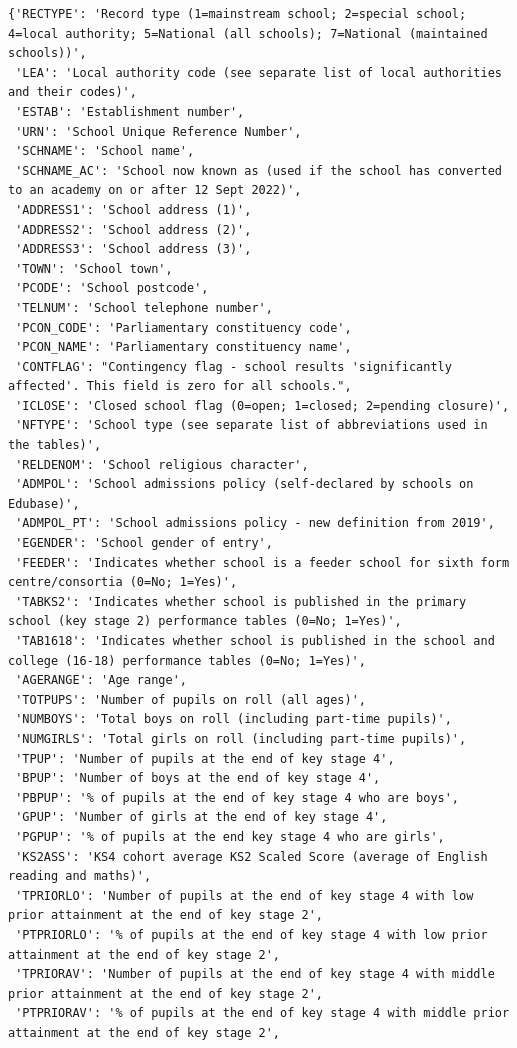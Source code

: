 \documentclass[
  letterpaper,
  DIV=11,
  numbers=noendperiod]{scrartcl}
\begin{document}
\begin{verbatim}
{'RECTYPE': 'Record type (1=mainstream school; 2=special school; 4=local authority; 5=National (all schools); 7=National (maintained schools))',
 'LEA': 'Local authority code (see separate list of local authorities and their codes)',
 'ESTAB': 'Establishment number',
 'URN': 'School Unique Reference Number',
 'SCHNAME': 'School name',
 'SCHNAME_AC': 'School now known as (used if the school has converted to an academy on or after 12 Sept 2022)',
 'ADDRESS1': 'School address (1)',
 'ADDRESS2': 'School address (2)',
 'ADDRESS3': 'School address (3)',
 'TOWN': 'School town',
 'PCODE': 'School postcode',
 'TELNUM': 'School telephone number',
 'PCON_CODE': 'Parliamentary constituency code',
 'PCON_NAME': 'Parliamentary constituency name',
 'CONTFLAG': "Contingency flag - school results 'significantly affected'. This field is zero for all schools.",
 'ICLOSE': 'Closed school flag (0=open; 1=closed; 2=pending closure)',
 'NFTYPE': 'School type (see separate list of abbreviations used in the tables)',
 'RELDENOM': 'School religious character',
 'ADMPOL': 'School admissions policy (self-declared by schools on Edubase)',
 'ADMPOL_PT': 'School admissions policy - new definition from 2019',
 'EGENDER': 'School gender of entry',
 'FEEDER': 'Indicates whether school is a feeder school for sixth form centre/consortia (0=No; 1=Yes)',
 'TABKS2': 'Indicates whether school is published in the primary school (key stage 2) performance tables (0=No; 1=Yes)',
 'TAB1618': 'Indicates whether school is published in the school and college (16-18) performance tables (0=No; 1=Yes)',
 'AGERANGE': 'Age range',
 'TOTPUPS': 'Number of pupils on roll (all ages)',
 'NUMBOYS': 'Total boys on roll (including part-time pupils)',
 'NUMGIRLS': 'Total girls on roll (including part-time pupils)',
 'TPUP': 'Number of pupils at the end of key stage 4',
 'BPUP': 'Number of boys at the end of key stage 4',
 'PBPUP': '% of pupils at the end of key stage 4 who are boys',
 'GPUP': 'Number of girls at the end of key stage 4',
 'PGPUP': '% of pupils at the end key stage 4 who are girls',
 'KS2ASS': 'KS4 cohort average KS2 Scaled Score (average of English reading and maths)',
 'TPRIORLO': 'Number of pupils at the end of key stage 4 with low prior attainment at the end of key stage 2',
 'PTPRIORLO': '% of pupils at the end of key stage 4 with low prior attainment at the end of key stage 2',
 'TPRIORAV': 'Number of pupils at the end of key stage 4 with middle prior attainment at the end of key stage 2',
 'PTPRIORAV': '% of pupils at the end of key stage 4 with middle prior attainment at the end of key stage 2',

\end{verbatim}
\end{document}
